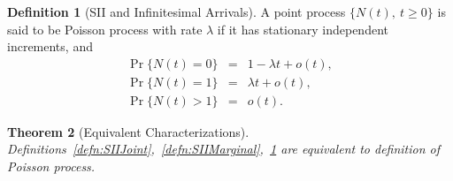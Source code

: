 \documentclass[a4paper,10pt]{article}
\theoremstyle{plain}
\newtheorem{thm}{Theorem}[section]
\theoremstyle{definition}
\newtheorem{defn}[thm]{Definition}
\begin{document}
\begin{defn}[SII and Infinitesimal Arrivals]\label{defn:SIIInfinitesimal} A point process $\{N(t),~t\geqslant 0\}$ is said to be Poisson process with rate $\lambda$ if it has stationary independent increments, and 
\begin{eqnarray*}\label{eqn1}
\Pr\{N(t)=0\} &=& 1-\lambda t + o(t), \\
  \Pr\{N(t)=1\} &=& \lambda t + o(t), \\
  \Pr\{N(t)>1\} &=& o(t).
\end{eqnarray*}
\end{defn}

\begin{thm}[Equivalent Characterizations] Definitions~\ref{defn:SIIJoint},~\ref{defn:SIIMarginal},~\ref{defn:SIIInfinitesimal} are equivalent to definition of Poisson process.
\end{thm}
\end{document}
